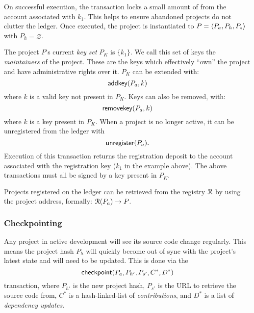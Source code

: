 On successful execution, the transaction locks a small amount of \oscoin{} from
the account associated with $k_1$. This helps to ensure abandoned projects
do not clutter the ledger.  Once executed, the project is instantiated to $P =
\langle P_a, P_h, P_s\rangle$ with $P_h = \varnothing$.

The project $P$'s current \emph{key set} $P_K$ is $\{k_1\}$. We call this set of
keys the \emph{maintainers} of the project. These are the keys which effectively
``own'' the project and have administrative rights over it. $P_K$ can be extended
with:
\[
    \mathsf{addkey}\lparen P_a, k\rparen
\]
where $k$ is a valid key not present in $P_K$. Keys can also be removed, with:
\[
    \mathsf{removekey}\lparen P_a, k\rparen
\]
where $k$ is a key present in $P_K$. When a project is no longer active, it can be
unregistered from the ledger with
\[
    \mathsf{unregister}\lparen P_a\rparen.
\]
Execution of this transaction returns the registration deposit to the account
associated with the registration key ($k_1$ in the example above).  The above
transactions must all be signed by a key present in $P_K$.

Projects registered on the ledger can be retrieved from the registry $\mathcal{R}$ by
using the project address, formally: $\mathcal{R}(P_a) \to P$.

\subsubsection{Checkpointing} \label{s:checkpointing} Any project in active
development will see its source code change regularly. This means the project
hash $P_h$ will quickly become out of sync with the project's latest state and
will need to be updated. This is done via the
\[
    \mathsf{checkpoint}\lparen P_a, P_{h'}, P_{s'}, C^*, D^*\rparen
\]
transaction, where $P_{h'}$ is the new project hash, $P_{s'}$ is the URL to
retrieve the source code from, $C^*$ is a hash-linked-list of
\emph{contributions}, and $D^*$ is a list of \emph{dependency updates}.


